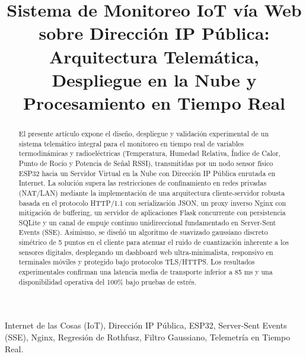 \documentclass[conference]{IEEEtran}
\begin{document}
\title{Sistema de Monitoreo IoT vía Web sobre Dirección IP Pública: \\ Arquitectura Telemática, Despliegue en la Nube y Procesamiento en Tiempo Real}

\author{
}

\maketitle

\begin{abstract}
El presente artículo expone el diseño, despliegue y validación experimental de un sistema telemático integral para el monitoreo en tiempo real de variables termodinámicas y radioeléctricas (Temperatura, Humedad Relativa, Índice de Calor, Punto de Rocío y Potencia de Señal RSSI), transmitidas por un nodo sensor físico ESP32 hacia un Servidor Virtual en la Nube con Dirección IP Pública enrutada en Internet. La solución supera las restricciones de confinamiento en redes privadas (NAT/LAN) mediante la implementación de una arquitectura cliente-servidor robusta basada en el protocolo HTTP/1.1 con serialización JSON, un proxy inverso Nginx con mitigación de buffering, un servidor de aplicaciones Flask concurrente con persistencia SQLite y un canal de empuje continuo unidireccional fundamentado en Server-Sent Events (SSE). Asimismo, se diseñó un algoritmo de suavizado gaussiano discreto simétrico de 5 puntos en el cliente para atenuar el ruido de cuantización inherente a los sensores digitales, desplegando un dashboard web ultra-minimalista, responsivo en terminales móviles y protegido bajo protocolos TLS/HTTPS. Los resultados experimentales confirman una latencia media de transporte inferior a 85 ms y una disponibilidad operativa del 100\% bajo pruebas de estrés.
\end{abstract}

\begin{IEEEkeywords}
Internet de las Cosas (IoT), Dirección IP Pública, ESP32, Server-Sent Events (SSE), Nginx, Regresión de Rothfusz, Filtro Gaussiano, Telemetría en Tiempo Real.
\end{IEEEkeywords}
\end{document}
